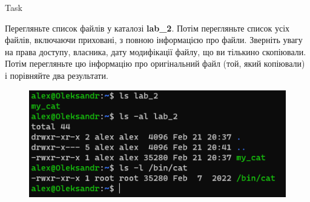 \documentclass[a4paper,12pt]{article}
\newcommand{\RomanNumeralCaps}[1]{\MakeUppercase{\romannumeral #1}}
\begin{document}
\newpage
    \begin{center}
        \Large{Task \RomanNumeralCaps{4}}
    \end{center}
    Перегляньте список файлів у каталозі \textbf{lab\_2}. Потім перегляньте список усіх файлів, включаючи приховані, з
    повною інформацією про файли. Зверніть увагу на права доступу, власника, дату модифікації файлу, що ви тількино скопіювали. 
    Потім перегляньте цю інформацію про оригінальний файл (той, який копіювали) і порівняйте два результати.
    \begin{figure}[h!]
        \begin{minipage}[h]{1\linewidth}
            \centering
            \includegraphics[width=0.6\linewidth]{Prt sc/Figure_4.png}  
        \end{minipage}
    \end{figure}
\end{document}
